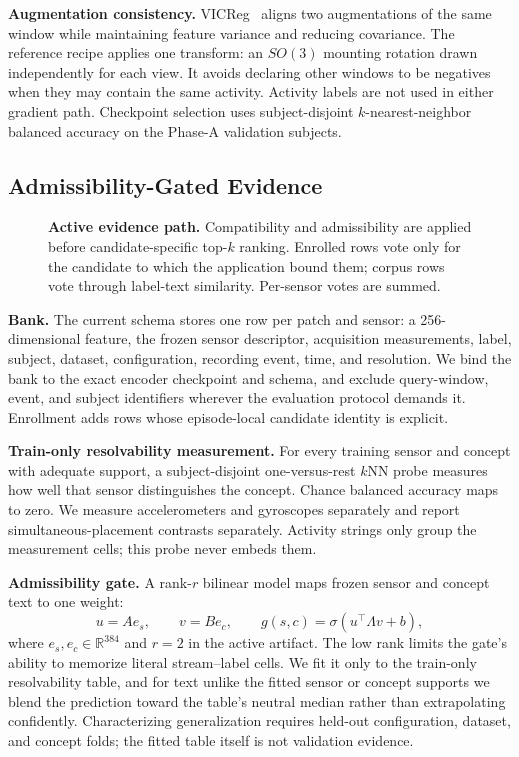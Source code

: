 \textbf{Augmentation consistency.} VICReg~\cite{vicreg} aligns two augmentations of the same window
while maintaining feature variance and reducing covariance. The reference recipe applies one
transform: an $SO(3)$ mounting rotation drawn independently for each view. It avoids declaring other
windows to be negatives when they may contain the same activity. Activity labels are not used in
either gradient path. Checkpoint selection uses subject-disjoint $k$-nearest-neighbor balanced
accuracy on the Phase-A validation subjects.

\subsection{Admissibility-Gated Evidence}
\label{sec:evidence_design}

\begin{figure}[t]
  \centering
  \setlength{\abovecaptionskip}{4pt}
  \setlength{\belowcaptionskip}{-4pt}
  
  \caption{\textbf{Active evidence path.} Compatibility and admissibility are applied before
  candidate-specific top-$k$ ranking. Enrolled rows vote only for the candidate to which the
  application bound them; corpus rows vote through label-text similarity. Per-sensor votes are
  summed.}
  \label{fig:evidence}
\end{figure}

\textbf{Bank.} The current schema stores one row per patch and sensor: a 256-dimensional feature,
the frozen sensor descriptor, acquisition measurements, label, subject, dataset, configuration,
recording event, time, and resolution. We bind the bank to the exact encoder checkpoint and schema,
and exclude query-window, event, and subject identifiers wherever the evaluation protocol demands
it. Enrollment adds rows whose episode-local candidate identity is explicit.

\textbf{Train-only resolvability measurement.} For every training sensor and concept with adequate
support, a subject-disjoint one-versus-rest $k$NN probe measures how well that sensor distinguishes
the concept. Chance balanced accuracy maps to zero. We measure accelerometers and gyroscopes
separately and report simultaneous-placement contrasts separately. Activity strings only group the
measurement cells; this probe never embeds them.

\textbf{Admissibility gate.} A rank-$r$ bilinear model maps frozen sensor and concept text to one
weight:
\[
 u=Ae_s,\qquad v=Be_c,\qquad
 g(s,c)=\sigma\!\left(u^\top\Lambda v+b\right),
\]
where $e_s,e_c\in\mathbb{R}^{384}$ and $r{=}2$ in the active artifact. The low rank limits the
gate's ability to memorize literal stream--label cells. We fit it only to the train-only
resolvability table, and for text unlike the fitted sensor or concept supports we blend the
prediction toward the table's neutral median rather than extrapolating confidently. Characterizing
generalization requires held-out configuration, dataset, and concept folds; the fitted table itself
is not validation evidence.

